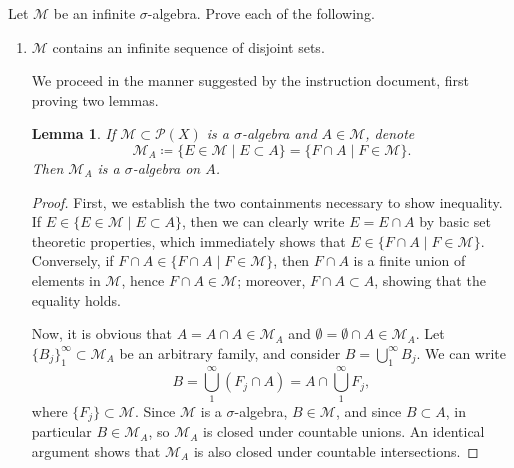 \documentclass[12pt]{article}
\newenvironment{problem}[2][Problem]{\begin{trivlist}
    \item[\hskip \labelsep {\bfseries #1}\hskip \labelsep {\bfseries #2.}]}{\end{trivlist}}
\newtheorem{lem}[thm]{Lemma}
\theoremstyle{definition}
\begin{document}
\begin{problem}{1.2.3}
	Let \( \mathcal{M} \) be an infinite \( \sigma \)-algebra. Prove each of the following.
	\begin{enumerate}[label=(\alph*)]
		\item \( \mathcal{M} \) contains an infinite sequence of disjoint sets.

            We proceed in the manner suggested by the instruction document, first proving two lemmas.
          \begin{lem}
            If \( \mathcal{M} \subset \mathcal{P}(X) \) is a \( \sigma \)-algebra and \( A \in \mathcal{M} \), denote
            \begin{equation}
            \label{eq:37}
            \mathcal{M}_A \coloneq \{ E \in \mathcal{M} \mid E \subset A \} = \{ F \cap A \mid F \in \mathcal{M} \}.
            \end{equation}
            Then \( \mathcal{M}_A \) is a \( \sigma \)-algebra on \( A \).
          \end{lem}
		      \begin{proof}
            First, we establish the two containments necessary to show inequality.
            If \( E \in \{ E \in \mathcal{M} \mid E \subset A\} \), then we can clearly write \( E = E \cap A \) by basic set theoretic properties, which immediately shows that \( E \in \{ F \cap A \mid F \in \mathcal{M} \} \).
            Conversely, if \( F \cap A \in \{F \cap A \mid F \in \mathcal{M}\} \), then \( F \cap A \) is a finite union of elements in \( \mathcal{M} \), hence \( F \cap A \in \mathcal{M} \);
            moreover, \( F \cap A \subset A \), showing that the equality holds.

            Now, it is obvious that \( A = A \cap A \in \mathcal{M}_A \) and \( \emptyset = \emptyset \cap A \in \mathcal{M}_A \).
            Let \( \{ B_j \}_1^{\infty} \subset \mathcal{M}_A\) be an arbitrary family, and consider \( B = \bigcup_1^{\infty} B_j \).
            We can write
            \begin{equation}
            \label{eq:38}
            B = \bigcup_{1}^{\infty} (F_j \cap A) = A \cap \bigcup_1^{\infty} F_j,
            \end{equation}
            where \( \{F_j\} \subset \mathcal{M} \).
            Since \( \mathcal{M} \) is a \(\sigma\)-algebra, \( B \in \mathcal{M} \), and since \( B \subset A \), in particular \( B \in \mathcal{M}_A \), so \( \mathcal{M}_A \) is closed under countable unions.
            An identical argument shows that \( \mathcal{M}_A \) is also closed under countable intersections.


\end{proof}
\end{enumerate}
\end{problem}
\end{document}
